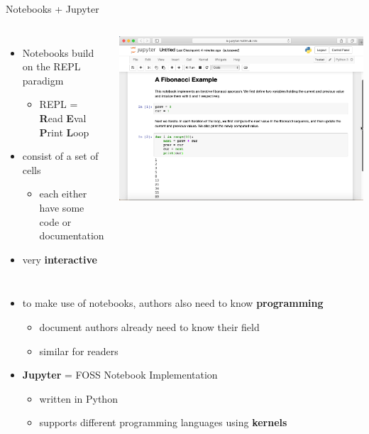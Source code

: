 \documentclass{beamer}
\begin{document}
    \begin{frame}{Notebooks + Jupyter}
        \begin{columns}
            \begin{itemize}
                \item Notebooks build on the REPL paradigm
                \begin{itemize}
                    \item REPL = \textbf{R}ead \textbf{E}val \textbf{P}rint \textbf{L}oop
                \end{itemize}
                \item consist of a set of cells
                \begin{itemize}
                    \item each either have some code or documentation
                \end{itemize}
                \item very \textbf{interactive}
            \end{itemize}
            \includegraphics[scale=0.2]{images/notebook}
        \end{columns}

        \begin{itemize}
            \item to make use of notebooks, authors also need to know \textbf{programming}
            \begin{itemize}
                \item document authors already need to know their field
                \item similar for readers
            \end{itemize}
            \item \textbf{Jupyter} = FOSS Notebook Implementation
            \begin{itemize}
                \item written in Python
                \item supports different programming languages using \textbf{kernels}
            \end{itemize}
        
        \end{itemize}
    \end{frame}
\end{document}
